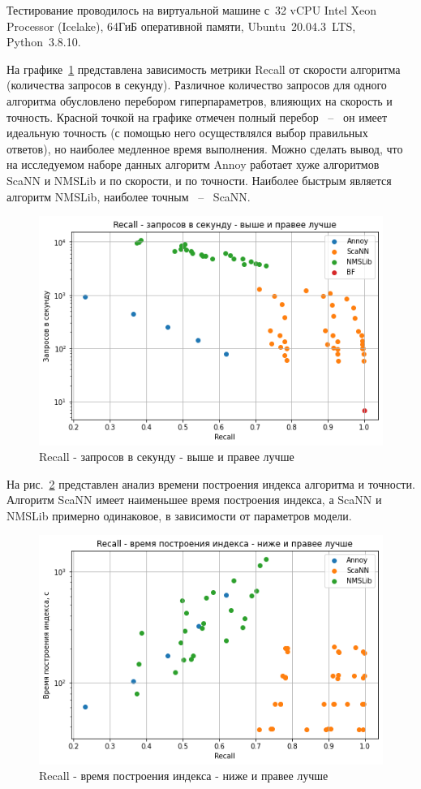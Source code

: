 \documentclass[a4paper,14pt]{article}
\begin{document}
    Тестирование проводилось на виртуальной машине с~32 vCPU Intel Xeon Processor (Icelake), 64ГиБ оперативной памяти, Ubuntu~20.04.3~LTS, Python~3.8.10.
    
    На графике~\ref{fig:ann_recall_qps} представлена зависимость метрики Recall от скорости алгоритма (количества запросов в секунду).
    Различное количество запросов для одного алгоритма обусловлено перебором гиперпараметров, влияющих на скорость и точность. 
    Красной точкой на графике отмечен полный перебор ~--~ он имеет идеальную точность (с помощью него осуществлялся выбор правильных ответов), но наиболее медленное время выполнения.
    Можно сделать вывод, что на исследуемом наборе данных алгоритм Annoy работает хуже алгоритмов ScaNN и NMSLib и по скорости, и по точности. 
    Наиболее быстрым является алгоритм NMSLib, наиболее точным ~--~ ScaNN.
    
    \begin{figure}[H]
    	\centering
    	\includegraphics[width=0.7\linewidth]{images/ann_recall_qps}
    	\caption{Recall - запросов в секунду - выше и правее лучше}
    	\label{fig:ann_recall_qps}
    \end{figure}

	На рис.~\ref{fig:ann_recall_build} представлен анализ времени построения индекса алгоритма и точности. 
	Алгоритм ScaNN имеет наименьшее время построения индекса, а ScaNN и NMSLib примерно одинаковое, в зависимости от параметров модели.

    \begin{figure}[H]
		\centering
		\includegraphics[width=0.7\linewidth]{images/ann_recall_build}
		\caption{Recall - время построения индекса - ниже и правее лучше}
		\label{fig:ann_recall_build}
	\end{figure}
\end{document}
